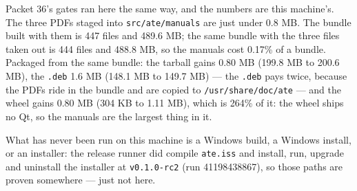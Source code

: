 Packet 36's gates ran here the same way, and the numbers are this machine's. The three PDFs staged
into \texttt{src/\allowbreak{}ate/\allowbreak{}manuals} are just under 0.8 MB. The bundle built with them is 447 files and
489.6 MB; the same bundle with the three files taken out is 444 files and 488.8 MB, so the manuals
cost 0.17\% of a bundle. Packaged from the same bundle: the tarball gains 0.80 MB (199.8 MB to
200.6 MB), the \texttt{.deb} 1.6 MB (148.1 MB to 149.7 MB) --- the \texttt{.deb} pays twice, because the
PDFs ride in the bundle and are copied to \texttt{/usr/share/\allowbreak{}doc/ate} --- and the wheel gains 0.80 MB
(304 KB to 1.11 MB), which is 264\% of it: the wheel ships no Qt, so the manuals are the largest thing
in it.

What has never been run on
this machine is a Windows build, a Windows install, or an installer: the release runner did compile
\texttt{ate.iss} and install, run, upgrade and uninstall the installer at \texttt{v0.1.0-rc2} (run
41198438867), so those paths are proven somewhere --- just not here.

